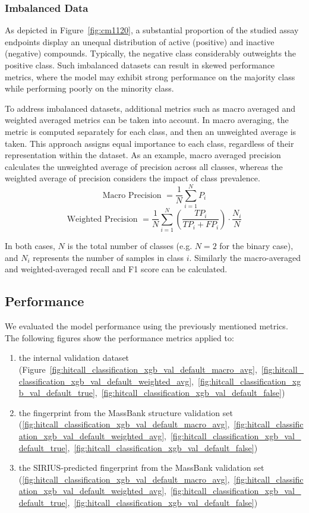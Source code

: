 \subsubsection{Imbalanced Data}
As depicted in Figure~\ref{fig:cm1120}, a substantial proportion of the studied assay endpoints display an unequal distribution of active (positive) and inactive (negative) compounds. Typically, the negative class considerably outweights the positive class. Such imbalanced datasets can result in skewed performance metrics, where the model may exhibit strong performance on the majority class while performing poorly on the minority class.

To address imbalanced datasets, additional metrics such as macro averaged and weighted averaged metrics can be taken into account.
In macro averaging, the metric is computed separately for each class, and then an unweighted average is taken. This approach assigns equal importance to each class, regardless of their representation within the dataset. As an example, macro averaged precision calculates the unweighted average of precision across all classes, whereas the weighted average of precision considers the impact of class prevalence.
\[ \text{Macro Precision } = \frac{1}{N} \sum_{i=1}^{N} P_i \] 
\[ \text{Weighted Precision } = \frac{1}{N} \sum_{i=1}^{N} \left(\frac{TP_i}{TP_i + FP_i}\right) \cdot \frac{N_i}{N} \]

In both cases, $N$ is the total number of classes (e.g. $N=2$ for the binary case), and $N_i$ represents the number of samples in class $i$. Similarly the macro-averaged and weighted-averaged recall and F1 score can be calculated.


\subsection{Performance}
We evaluated the model performance using the previously mentioned metrics. The following figures show the performance metrics applied to:

\begin{enumerate}
  \item the internal validation dataset (Figure~\ref{fig:hitcall_classification_xgb_val_default_macro_avg},~\ref{fig:hitcall_classification_xgb_val_default_weighted_avg},~\ref{fig:hitcall_classification_xgb_val_default_true},~\ref{fig:hitcall_classification_xgb_val_default_false})
  \item the fingerprint from the MassBank structure validation set (\ref{fig:hitcall_classification_xgb_val_default_macro_avg},~\ref{fig:hitcall_classification_xgb_val_default_weighted_avg},~\ref{fig:hitcall_classification_xgb_val_default_true},~\ref{fig:hitcall_classification_xgb_val_default_false})
  \item the SIRIUS-predicted fingerprint from the MassBank validation set (\ref{fig:hitcall_classification_xgb_val_default_macro_avg},~\ref{fig:hitcall_classification_xgb_val_default_weighted_avg},~\ref{fig:hitcall_classification_xgb_val_default_true},~\ref{fig:hitcall_classification_xgb_val_default_false})
\end{enumerate}

